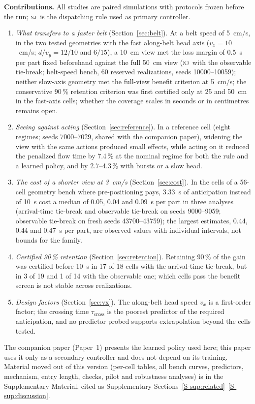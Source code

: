 \documentclass[11pt,a4paper]{article}
\newcommand{\nj}{\textsc{nj}}
\newcommand{\tcross}{\tau_{\mathrm{cross}}}
\begin{document}
\textbf{Contributions.} All studies are paired simulations with protocols frozen before
the run; \nj\ is the dispatching rule used as primary controller.
\begin{enumerate}[nosep]
\item \emph{What transfers to a faster belt} (Section~\ref{sec:belt}). At a belt speed of
  5~cm/s, in the two tested geometries with the fast along-belt head axis ($v_x=10$~cm/s;
  $d/v_y=12/10$ and $6/15$), a 10~cm view met the loss margin of 0.5~s per part fixed
  beforehand against the full 50~cm view (\nj\ with the observable tie-break; belt-speed
  bench, 60 reserved realizations, seeds 10000--10059); neither slow-axis geometry met the full-view benefit
  criterion at 5~cm/s; the conservative 90\,\% retention criterion was first certified only
  at 25 and 50~cm in the fast-axis cells; whether the coverage scales in seconds or in
  centimetres remains open.
\item \emph{Seeing against acting} (Section~\ref{sec:reference}). In a reference cell
  (eight regimes; seeds 7000--7029, shared with the companion paper), widening the view
  with the same actions produced small effects, while acting on it reduced the penalized
  flow time by 7.4\,\% at the nominal regime for both the rule and a learned policy, and by
  2.7--4.3\,\% with bursts or a slow head.
\item \emph{The cost of a shorter view at 3~cm/s} (Section~\ref{sec:cost}). In the cells
  of a 56-cell geometry bench where pre-positioning pays, 3.33~s of anticipation instead of
  10~s cost a median of 0.05, 0.04 and 0.09~s per part in three analyses (arrival-time
  tie-break and observable tie-break on seeds 9000--9059; observable tie-break on fresh
  seeds 43700--43759); the largest estimates, 0.44, 0.44 and 0.47~s per part, are observed
  values with individual intervals, not bounds for the family.
\item \emph{Certified 90\,\% retention} (Section~\ref{sec:retention}). Retaining 90\,\% of
  the gain was certified before 10~s in 17 of 18 cells with the arrival-time tie-break, but
  in 3 of 19 and 1 of 14 with the observable one; which cells pass the benefit screen is not
  stable across realizations.
\item \emph{Design factors} (Section~\ref{sec:vx}). The along-belt head speed $v_x$ is a
  first-order factor; the crossing time $\tcross$ is the poorest predictor of the required
  anticipation, and no predictor probed supports extrapolation beyond the cells tested.
\end{enumerate}
The companion paper (Paper~1) presents the learned policy used here; this paper uses it
only as a secondary controller and does not depend on its training. Material moved out of
this version (per-cell tables, all bench curves, predictors, mechanism, entry length,
checks, pilot and robustness analyses) is in the Supplementary Material, cited as
Supplementary Sections~\ref{S-sup:related}--\ref{S-sup:discussion}.
\end{document}
